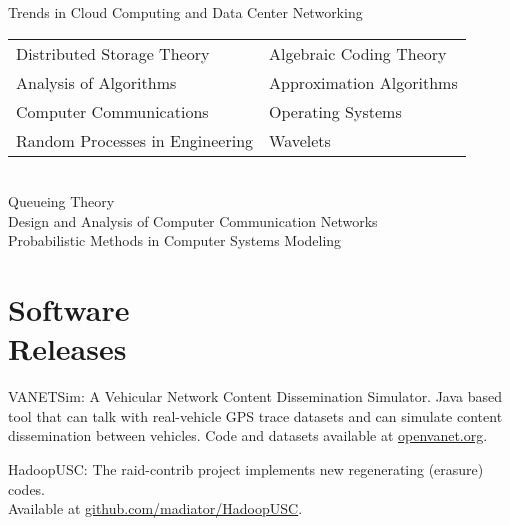 \documentclass[margin,line]{resume}
\begin{document}
\begin{resume}
Trends in Cloud Computing and Data Center Networking\\
\begin{tabular}{@{}p{7cm}p{7cm}}
Distributed Storage Theory & Algebraic Coding Theory \\
Analysis of Algorithms  &  Approximation Algorithms                   \\
Computer Communications  & Operating Systems \\
Random Processes in Engineering  & Wavelets \\
\end{tabular} \\
Queueing Theory \\
Design and Analysis of Computer Communication Networks \\
Probabilistic Methods in Computer Systems Modeling


\section{\mysidestyle Software \\ Releases}
\begin{list2}
\item VANETSim: A Vehicular Network Content Dissemination Simulator. Java based tool that can talk with real-vehicle GPS trace datasets and can simulate content dissemination between vehicles. Code and datasets available at \href{http://www.openvanet.org}{openvanet.org}.
\item HadoopUSC: The raid-contrib project implements new regenerating (erasure) codes. \\Available at \href{https://github.com/madiator/HadoopUSC}{github.com/madiator/HadoopUSC}.
\end{list2}



\end{resume}
\end{document}
